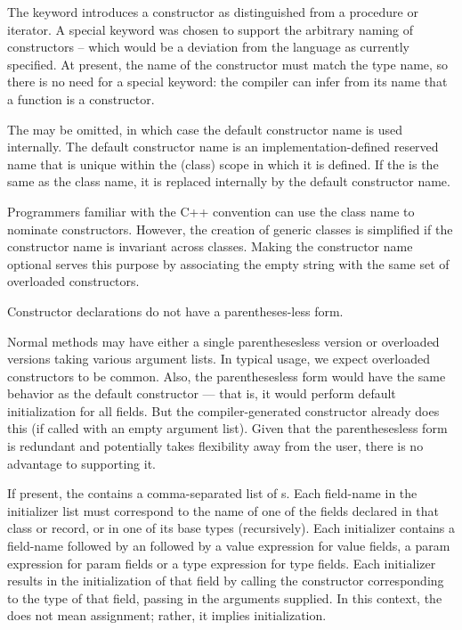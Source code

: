 The keyword  introduces a constructor as distinguished from a procedure or
iterator.  A special keyword was chosen to support the arbitrary naming of constructors --
which would be a deviation from the language as currently specified.  At present, the name
of the constructor must match the type name, so there is no need for a special keyword:
the compiler can infer from its name that a function is a constructor.

The  may be omitted, in which case the default
constructor name is used internally.  The default constructor name is an
implementation-defined reserved name that is unique within the (class) scope in
which it is defined.  If the  is
the same as the class name, it is replaced internally by the default constructor name.
\begin{rationale}
Programmers familiar with the C++ convention can use the class name to nominate
constructors.  However, the creation of generic classes is simplified if the
constructor name is invariant across classes.  Making the constructor name
optional serves this purpose by associating the empty string with the same set
of overloaded constructors.
\end{rationale}

Constructor declarations do not have a parentheses-less form.
\begin{rationale}
Normal methods may have either a single parenthesesless version or overloaded
versions taking various argument lists.  In typical usage, we expect overloaded
constructors to be common.  Also, the parenthesesless form would have the same
behavior as the default constructor --- that is, it would perform default
initialization for all fields.  But the compiler-generated constructor already
does this (if called with an empty argument list).  Given that the
parenthesesless form is redundant and potentially takes flexibility away from
the user, there is no advantage to supporting it.
\end{rationale}

If present, the  contains a comma-separated list of
s.  Each field-name in the initializer list must correspond to the name
of one of the fields declared in that class or record, or in one of its base types
(recursively).  Each initializer contains a field-name followed by an
\chpl{=} followed by a value expression for value fields, a param expression for param fields or a type expression for type fields.
Each initializer results in the initialization of that field by
calling the constructor corresponding to the type of that field, passing in the arguments
supplied.  In this context, the \chpl{=} does not mean assignment; rather, it implies
initialization.

